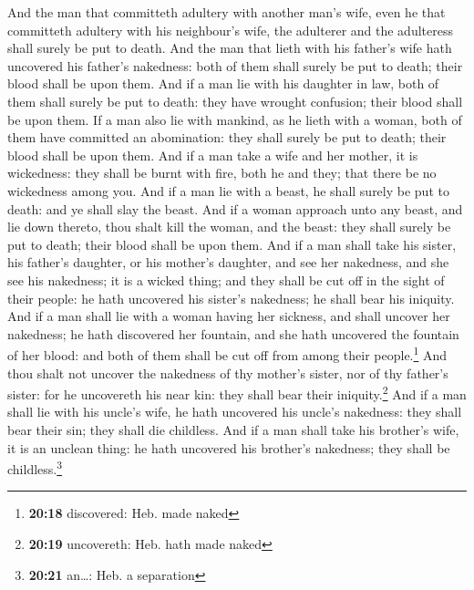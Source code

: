  And the man that committeth adultery with another man's
wife, even he that committeth adultery with his neighbour's wife, the
adulterer and the adulteress shall surely be put to death.
 And the man that lieth with his father's wife hath
uncovered his father's nakedness: both of them shall surely be put to
death; their blood shall be upon them.  And if a man lie
with his daughter in law, both of them shall surely be put to death:
they have wrought confusion; their blood shall be upon them.
 If a man also lie with mankind, as he lieth with a
woman, both of them have committed an abomination: they shall surely be
put to death; their blood shall be upon them.  And if a
man take a wife and her mother, it is wickedness: they shall be burnt
with fire, both he and they; that there be no wickedness among you.
 And if a man lie with a beast, he shall surely be put to
death: and ye shall slay the beast.  And if a woman
approach unto any beast, and lie down thereto, thou shalt kill the
woman, and the beast: they shall surely be put to death; their blood
shall be upon them.  And if a man shall take his sister,
his father's daughter, or his mother's daughter, and see her nakedness,
and she see his nakedness; it is a wicked thing; and they shall be cut
off in the sight of their people: he hath uncovered his sister's
nakedness; he shall bear his iniquity.  And if a man
shall lie with a woman having her sickness, and shall uncover her
nakedness; he hath discovered her fountain, and she hath uncovered the
fountain of her blood: and both of them shall be cut off from among
their people.\footnote{\textbf{20:18} discovered: Heb. made naked}
 And thou shalt not uncover the nakedness of thy mother's
sister, nor of thy father's sister: for he uncovereth his near kin: they
shall bear their iniquity.\footnote{\textbf{20:19} uncovereth: Heb. hath
  made naked}  And if a man shall lie with his uncle's
wife, he hath uncovered his uncle's nakedness: they shall bear their
sin; they shall die childless.  And if a man shall take
his brother's wife, it is an unclean thing: he hath uncovered his
brother's nakedness; they shall be childless.\footnote{\textbf{20:21}
  an\ldots: Heb. a separation}

